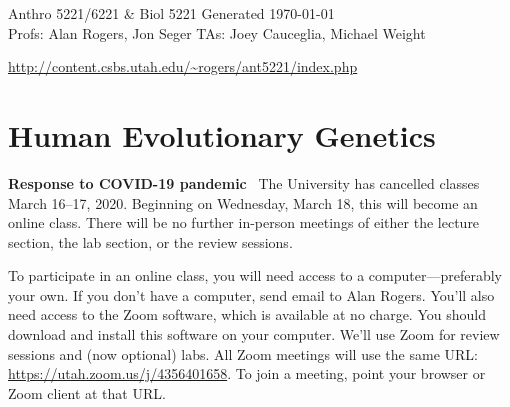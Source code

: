 \documentclass[11pt]{article}
\newcommand{\heading}[1]{\bigskip\noindent\textbf{#1}~}
\begin{document}
\begin{flushleft}
Anthro 5221/6221 \& Biol 5221     \hfill  Generated \today\\
Profs: Alan Rogers, Jon Seger %
\hfill TAs: Joey Cauceglia, Michael Weight\\
\end{flushleft}
\begin{center}
  \url{http://content.csbs.utah.edu/~rogers/ant5221/index.php}
\end{center}

\section*{\centering Human Evolutionary Genetics}

\heading{Response to COVID-19 pandemic} The University has cancelled
classes March 16--17, 2020. Beginning on Wednesday, March 18, this
will become an online class. There will be no further in-person
meetings of either the lecture section, the lab section, or the review
sessions.

To participate in an online class, you will need access to a
computer---preferably your own. If you don't have a computer, send
email to Alan Rogers. You'll also need access to the Zoom software,
which is available at no charge. You should download and install this
software on your computer. We'll use Zoom for review sessions and (now
optional) labs. All Zoom meetings will use the same URL:
\url{https://utah.zoom.us/j/4356401658}. To join a meeting, point your
browser or Zoom client at that URL.
\end{document}

